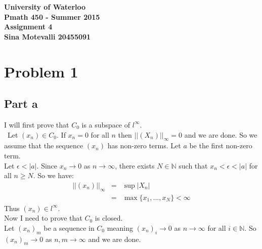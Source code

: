 \documentclass[12pt]{article}
\begin{document}
\begin{center}
  {\Large\bf University of Waterloo}\\
  \vspace{3mm}
         {\Large\bf Pmath 450 - Summer 2015}\\
         \vspace{2mm}
                {\Large\bf Assignment 4}\\
                \vspace{3mm}
                \textbf{Sina Motevalli 20455091}
\end{center}
\section*{Problem 1}
\subsection*{Part a}
I will first prove that $C_0$ is a subspace of $l^{\infty}$. \\\
Let $(x_n) \in C_0$. If $x_n =0$ for all $n$ then $||(X_n)||_{\infty}=0$ and we are done. So we assume that the sequence $(x_n)$ has non-zero terms. Let $a$ be the first non-zero term. \\
Let $\epsilon < |a|$. Since $x_n \rightarrow 0 $ as $n \rightarrow \infty$, there exists $N \in \mathbb{N}$ such that $x_n < \epsilon < |a|$ for all $n \ge N$. So we have: 
\begin{eqnarray*}
||(x_n)||_{\infty} &=& \sup |X_n| \\ &=&
\max\{x_1,...,x_N\}  < \infty
\end{eqnarray*}
Thus $(x_n) \in l^{\infty}$. \\
Now I need to prove that $C_0$ is closed. \\
Let $(x_n)_m$ be a sequence in $C_0$ meaning $(x_n)_i \rightarrow 0$ as $n \rightarrow \infty$ for all $i \in \mathbb{N}$. So $(x_n)_m \rightarrow 0$ as $n,m \rightarrow \infty$ and we are done.
\end{document}
